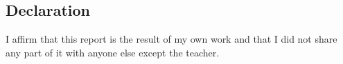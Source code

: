 \documentclass{article}
\begin{document}


\vfill
\subsection*{\normalsize Declaration}
I aﬃrm that this report is the result of my own work and that I did not share any part of it with anyone else except the teacher.
\end{document}
